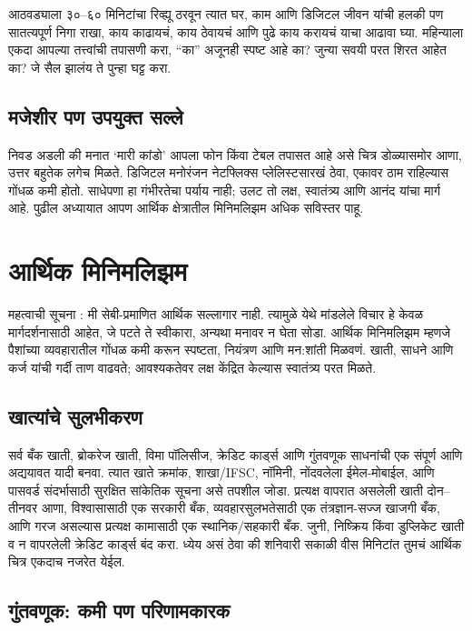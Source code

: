 आठवड्याला ३०–६० मिनिटांचा रिव्ह्यू ठरवून त्यात घर, काम आणि डिजिटल जीवन यांची हलकी पण सातत्यपूर्ण निगा राखा, काय काढायचं, काय ठेवायचं आणि पुढे काय करायचं याचा आढावा घ्या. महिन्याला एकदा आपल्या तत्त्वांची तपासणी करा, “का” अजूनही स्पष्ट आहे का? जुन्या सवयी परत शिरत आहेत का? जे सैल झालंय ते पुन्हा घट्ट करा.

\section*{मजेशीर पण उपयुक्त सल्ले}

निवड अडली की मनात ‘मारी कांडो’ आपला फोन किंवा टेबल तपासत आहे असे चित्र डोळ्यासमोर आणा, उत्तर बहुतेक लगेच मिळते. डिजिटल मनोरंजन नेटफ्लिक्स प्लेलिस्टसारखं ठेवा, एकावर ठाम राहिल्यास गोंधळ कमी होतो. साधेपणा हा गंभीरतेचा पर्याय नाही; उलट तो लक्ष, स्वातंत्र्य आणि आनंद यांचा मार्ग आहे. पुढील अध्यायात आपण आर्थिक क्षेत्रातील मिनिमलिझम अधिक सविस्तर पाहू.

\chapter{आर्थिक मिनिमलिझम}

महत्वाची सूचना : मी सेबी-प्रमाणित आर्थिक सल्लागार नाही. त्यामुळे येथे मांडलेले विचार हे केवळ मार्गदर्शनासाठी आहेत, जे पटते ते स्वीकारा, अन्यथा मनावर न घेता सोडा. आर्थिक मिनिमलिझम म्हणजे पैशांच्या व्यवहारातील गोंधळ कमी करून स्पष्टता, नियंत्रण आणि मन:शांती मिळवणं. खाती, साधने आणि कर्ज यांची गर्दी ताण वाढवते; आवश्यकतेवर लक्ष केंद्रित केल्यास स्वातंत्र्य परत मिळते.

\section*{खात्यांचे सुलभीकरण}

सर्व बँक खाती, ब्रोकरेज खाती, विमा पॉलिसीज, क्रेडिट कार्ड्स आणि गुंतवणूक साधनांची एक संपूर्ण आणि अद्ययावत यादी बनवा. त्यात खाते क्रमांक, शाखा/IFSC, नॉमिनी, नोंदवलेला ईमेल-मोबाईल, आणि पासवर्ड संदर्भासाठी सुरक्षित सांकेतिक सूचना असे तपशील जोडा. प्रत्यक्ष वापरात असलेली खाती दोन–तीनवर आणा, विश्वासासाठी एक सरकारी बँक, व्यवहारसुलभतेसाठी एक तंत्रज्ञान-सज्ज खाजगी बँक, आणि गरज असल्यास प्रत्यक्ष कामासाठी एक स्थानिक/सहकारी बँक. जुनी, निष्क्रिय किंवा डुप्लिकेट खाती व न वापरलेली क्रेडिट कार्ड्स बंद करा. ध्येय असं ठेवा की शनिवारी सकाळी वीस मिनिटांत तुमचं आर्थिक चित्र एकदाच नजरेत येईल.

\section*{गुंतवणूक: कमी पण परिणामकारक}

